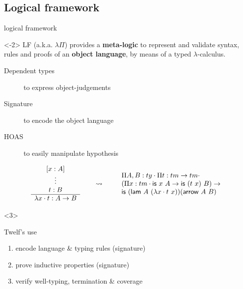 \documentclass[ignorenonframetext,red]{beamer}
\begin{document}
\subsection{Logical framework}

\begin{frame}{ logical framework }
  \begin{onlyenv}<-2>
    LF  (a.k.a. $\lambda\Pi$) provides a {\bf
      meta-logic} to represent and validate syntax, rules and proofs
    of an \textbf{object language}, by means of a typed
    $\lambda$-calculus.

    \begin{description}
    \item[Dependent types] to express object-judgements
    \item[Signature] to encode the object language
    \item[HOAS] to easily manipulate hypothesis
    \end{description}
    \pause
    \begin{example}
      \scriptsize
      \[
      \begin{array}{c}
        [x:A]\\
        \vdots\\
        t : B \\\hline
        \ulam x t : A\to B
      \end{array}
      \qquad\leadsto\qquad
      \begin{array}{l}
        \prd {A,B}{ty} \prd t {tm\to tm} \\
        (\prd x {tm} {\textsf{is}\ x\ A} \to \textsf{is}\ (t\ x)\ B) \to \\
        \textsf{is}\ (\textsf{lam}\ A\ (\ulam x t\ x))(\textsf{arrow}\ A\ B)
      \end{array}
      \]
    \end{example}
  \end{onlyenv}
  \begin{onlyenv}<3>
    \begin{block}{\textsf{Twelf}'s use}
      \begin{enumerate}
      \item encode language \& typing rules (signature)
      \item prove inductive properties (signature)
      \item verify well-typing, termination \& coverage
      \end{enumerate}
    \end{block}

\end{onlyenv}
\end{frame}
\end{document}
